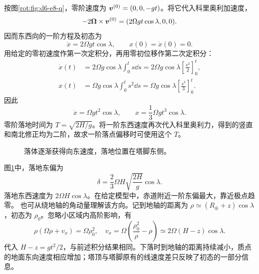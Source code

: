 \begin{solution}
按图\ref{rot:fig:d6-e8-q}，零阶速度为 $\bm{v}^{(0)}=(0,0,-gt)$。将它代入科里奥利加速度，
\[
-2\bm{\Omega}\times\bm{v}^{(0)}
=(2\Omega gt\cos\lambda,0,0).
\]
因而东西向的一阶方程及初态为
\[
\ddot x=2\Omega gt\cos\lambda,\qquad x(0)=\dot x(0)=0.
\]
用给定的零初速度作第一次定积分，再用零初位移作第二次定积分：
\[
\begin{aligned}
\dot x(t)&=2\Omega g\cos\lambda\int_0^ts\dd s
=2\Omega g\cos\lambda\left[\frac{s^2}{2}\right]_0^t,\\
x(t)&=\Omega g\cos\lambda\int_0^ts^2\dd s
=\Omega g\cos\lambda\left[\frac{s^3}{3}\right]_0^t.
\end{aligned}
\]
因此
\[
\dot x=\Omega gt^2\cos\lambda,\qquad
x=\frac13\Omega gt^3\cos\lambda.
\]
零阶落地时间为 $T=\sqrt{2H/g}$。将一阶东西速度再次代入科里奥利力，得到的竖直和南北修正均为二阶，故求一阶落点偏移时可使用这个 $T$。
\begin{figure}[H]\centering
{}
\caption{落体逐渐获得向东速度，落地位置在塔脚东侧。}\label{rot:fig:d6-e8-s}
\end{figure}
图\ref{rot:fig:d6-e8-s}中，落地东偏为
\[
\boxed{\delta=\frac23\Omega H\sqrt{\frac{2H}g}\cos\lambda.}
\]
落地东西速度为 $2\Omega H\cos\lambda$。在给定模型中，赤道附近一阶东偏最大，靠近极点趋零。
也可从绕地轴的角动量理解该方向。记到地轴的距离为 $\rho\simeq(R_\oplus+z)\cos\lambda$，初态为 $\rho_0$。忽略小区域内高阶影响，有
\[
\rho(\Omega\rho+v_x)=\Omega\rho_0^2,
\quad v_x=\Omega\left(\frac{\rho_0^2}\rho-\rho\right)
\simeq2\Omega(H-z)\cos\lambda.
\]
代入 $H-z=gt^2/2$，与前述积分结果相同。下落时到地轴的距离持续减小，质点的地面东向速度相应增加；塔顶与塔脚原有的线速度差只反映了初态的一部分信息。
\end{solution}




